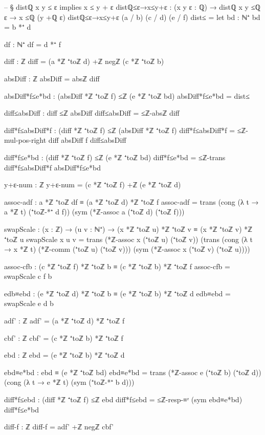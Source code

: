 \documentclass[11pt,a4paper]{book}
\begin{document}
\begin{code}
-- § distℚ x y ≤ ε implies x ≤ y + ε
distℚ≤ε→x≤y+ε : (x y ε : ℚ) → distℚ x y ≤ℚ ε → x ≤ℚ (y +ℚ ε)
distℚ≤ε→x≤y+ε (a / b) (c / d) (e / f) dist≤ =
  let
    bd : ℕ⁺
    bd = b *⁺ d

    df : ℕ⁺
    df = d *⁺ f

    diff : ℤ
    diff = (a *ℤ ⁺toℤ d) +ℤ negℤ (c *ℤ ⁺toℤ b)

    absDiff : ℤ
    absDiff = absℤ diff

    absDiff*f≤e*bd : (absDiff *ℤ ⁺toℤ f) ≤ℤ (e *ℤ ⁺toℤ bd)
    absDiff*f≤e*bd = dist≤

    diff≤absDiff : diff ≤ℤ absDiff
    diff≤absDiff = ≤ℤ-absℤ diff

    diff*f≤absDiff*f : (diff *ℤ ⁺toℤ f) ≤ℤ (absDiff *ℤ ⁺toℤ f)
    diff*f≤absDiff*f = ≤ℤ-mul-pos-right diff absDiff f diff≤absDiff

    diff*f≤e*bd : (diff *ℤ ⁺toℤ f) ≤ℤ (e *ℤ ⁺toℤ bd)
    diff*f≤e*bd = ≤ℤ-trans diff*f≤absDiff*f absDiff*f≤e*bd

    y+ε-num : ℤ
    y+ε-num = (c *ℤ ⁺toℤ f) +ℤ (e *ℤ ⁺toℤ d)

    assoc-adf : a *ℤ ⁺toℤ df ≡ (a *ℤ ⁺toℤ d) *ℤ ⁺toℤ f
    assoc-adf = trans (cong (λ t → a *ℤ t) (⁺toℤ-*⁺ d f)) (sym (*ℤ-assoc a (⁺toℤ d) (⁺toℤ f)))

    swapScale : (x : ℤ) → (u v : ℕ⁺) → (x *ℤ ⁺toℤ u) *ℤ ⁺toℤ v ≡ (x *ℤ ⁺toℤ v) *ℤ ⁺toℤ u
    swapScale x u v =
      trans
        (*ℤ-assoc x (⁺toℤ u) (⁺toℤ v))
        (trans
          (cong (λ t → x *ℤ t) (*ℤ-comm (⁺toℤ u) (⁺toℤ v)))
          (sym (*ℤ-assoc x (⁺toℤ v) (⁺toℤ u))))

    assoc-cfb : (c *ℤ ⁺toℤ f) *ℤ ⁺toℤ b ≡ (c *ℤ ⁺toℤ b) *ℤ ⁺toℤ f
    assoc-cfb = swapScale c f b

    edb≡ebd : (e *ℤ ⁺toℤ d) *ℤ ⁺toℤ b ≡ (e *ℤ ⁺toℤ b) *ℤ ⁺toℤ d
    edb≡ebd = swapScale e d b

    adf' : ℤ
    adf' = (a *ℤ ⁺toℤ d) *ℤ ⁺toℤ f

    cbf' : ℤ
    cbf' = (c *ℤ ⁺toℤ b) *ℤ ⁺toℤ f

    ebd : ℤ
    ebd = (e *ℤ ⁺toℤ b) *ℤ ⁺toℤ d

    ebd≡e*bd : ebd ≡ (e *ℤ ⁺toℤ bd)
    ebd≡e*bd =
      trans
        (*ℤ-assoc e (⁺toℤ b) (⁺toℤ d))
        (cong (λ t → e *ℤ t) (sym (⁺toℤ-*⁺ b d)))

    diff*f≤ebd : (diff *ℤ ⁺toℤ f) ≤ℤ ebd
    diff*f≤ebd = ≤ℤ-resp-≡ʳ (sym ebd≡e*bd) diff*f≤e*bd

    diff-f : ℤ
    diff-f = adf' +ℤ negℤ cbf'


\end{code}
\end{document}
